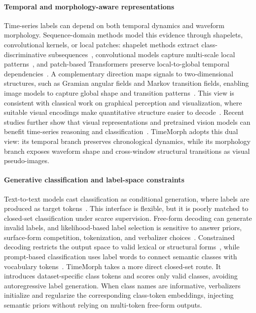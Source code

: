 \documentclass[10pt,journal,compsoc]{IEEEtran}
\begin{document}
\paragraph{Temporal and morphology-aware representations}
Time-series labels can depend on both temporal dynamics and waveform morphology.
Sequence-domain methods model this evidence through shapelets, convolutional kernels, or local patches: shapelet methods extract class-discriminative subsequences~\cite{ye2009shapelets,tang2020interpretable}, convolutional models capture multi-scale local patterns~\cite{fawaz2020inceptiontime,dempster2020rocket}, and patch-based Transformers preserve local-to-global temporal dependencies~\cite{nie2023time}.
A complementary direction maps signals to two-dimensional structures, such as Gramian angular fields and Markov transition fields, enabling image models to capture global shape and transition patterns~\cite{wang2015imaging}.
This view is consistent with classical work on graphical perception and visualization, where suitable visual encodings make quantitative structure easier to decode~\cite{cleveland1984graphical,heer2010tour}.
Recent studies further show that visual representations and pretrained vision models can benefit time-series reasoning and classification~\cite{liu2025picture,roschmann2025time}.
TimeMorph adopts this dual view: its temporal branch preserves chronological dynamics, while its morphology branch exposes waveform shape and cross-window structural transitions as visual pseudo-images.

\paragraph{Generative classification and label-space constraints}
Text-to-text models cast classification as conditional generation, where labels are produced as target tokens~\cite{raffel2020exploring}.
This interface is flexible, but it is poorly matched to closed-set classification under scarce supervision.
Free-form decoding can generate invalid labels, and likelihood-based label selection is sensitive to answer priors, surface-form competition, tokenization, and verbalizer choices~\cite{zhao2021calibrate,holtzman2021surface}.
Constrained decoding restricts the output space to valid lexical or structural forms~\cite{hokamp2017lexically,koo2024automata}, while prompt-based classification uses label words to connect semantic classes with vocabulary tokens~\cite{schick2021exploiting,gao2021making}.
TimeMorph takes a more direct closed-set route.
It introduces dataset-specific class tokens and scores only valid classes, avoiding autoregressive label generation.
When class names are informative, verbalizers initialize and regularize the corresponding class-token embeddings, injecting semantic priors without relying on multi-token free-form outputs.
\end{document}

